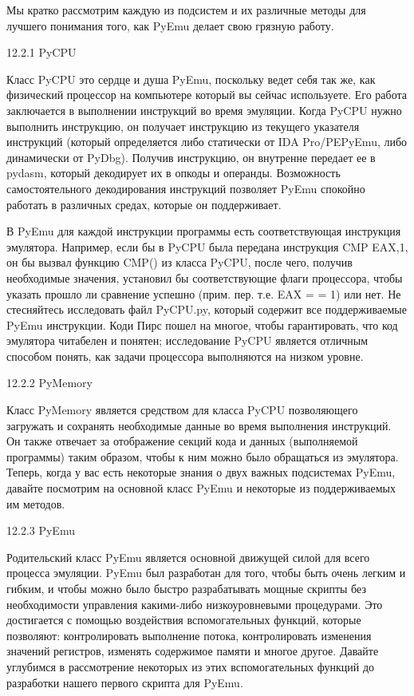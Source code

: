 \documentclass[12pt, a4paper, oneside]{book}
\begin{document}
Мы кратко рассмотрим каждую из подсистем и их различные методы для лучшего понимания того, как PyEmu делает свою грязную работу. 

12.2.1 PyCPU

Класс PyCPU это сердце и душа PyEmu, поскольку ведет себя так же, как физический процессор на компьютере который вы сейчас используете. Его работа заключается в выполнении инструкций во время эмуляции. Когда PyCPU нужно выполнить инструкцию, он получает инструкцию из текущего указателя инструкций (который определяется либо статически от IDA Pro/PEPyEmu, либо динамически от PyDbg). Получив инструкцию, он внутренне передает ее в pydasm, который декодирует их в опкоды и операнды. Возможность самостоятельного декодирования инструкций позволяет PyEmu спокойно работать в различных средах, которые он поддерживает.

В PyEmu для каждой инструкции программы есть соответствующая инструкция эмулятора. Например, если бы в PyCPU была передана инструкция CMP EAX,1, он бы вызвал функцию CMP() из класса PyCPU, после чего, получив необходимые значения, установил бы соответствующие флаги процессора, чтобы указать прошло ли сравнение успешно (прим. пер. т.е. EAX = = 1) или нет. Не стесняйтесь исследовать файл PyCPU.py, который содержит все поддерживаемые PyEmu инструкции. Коди Пирс пошел на многое, чтобы гарантировать, что код эмулятора читабелен и понятен; исследование PyCPU является отличным способом понять, как задачи процессора выполняются на низком уровне.

12.2.2 PyMemory

Класс PyMemory является средством для класса PyCPU позволяющего загружать и сохранять необходимые данные во время выполнения инструкций. Он также отвечает за отображение секций кода и данных (выполняемой программы) таким образом, чтобы к ним можно было обращаться из эмулятора. Теперь, когда у вас есть некоторые знания о двух важных подсистемах PyEmu, давайте посмотрим на основной класс PyEmu и некоторые из поддерживаемых им методов.

12.2.3 PyEmu

Родительский класс PyEmu является основной движущей силой для всего процесса эмуляции. PyEmu был разработан для того, чтобы быть очень легким и гибким, и чтобы можно было быстро разрабатывать мощные скрипты без необходимости управления какими-либо низкоуровневыми процедурами. Это достигается с помощью воздействия вспомогательных функций, которые позволяют: контролировать выполнение потока, контролировать изменения значений регистров, изменять содержимое памяти и многое другое. Давайте углубимся в рассмотрение некоторых из этих вспомогательных функций до разработки нашего первого скрипта для PyEmu.
\end{document}
